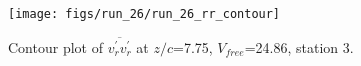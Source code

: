 \begin{figure}[H]
\centering
\texttt{[image: figs/run\_26/run\_26\_rr\_contour]}
\caption{Contour plot of $\overline{v_{r}^{\prime} v_{r}^{\prime}}$ at $z/c$=7.75, $V_{free}$=24.86, station 3.}
\label{fig:run_26_rr_contour}
\end{figure}


